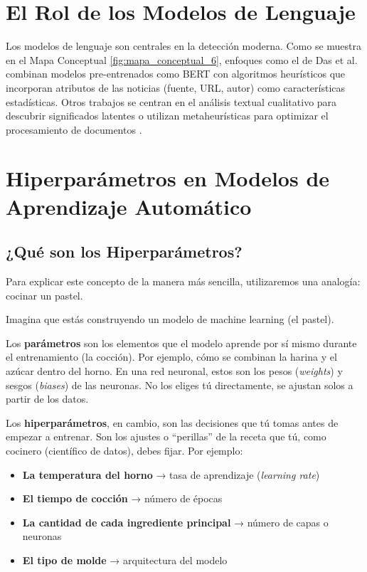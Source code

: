 \section{El Rol de los Modelos de Lenguaje}
Los modelos de lenguaje son centrales en la detección moderna. Como se muestra en el Mapa Conceptual \ref{fig:mapa_conceptual_6}, enfoques como el de Das et al. \cite{das2022heuristic} combinan modelos pre-entrenados como BERT con algoritmos heurísticos que incorporan atributos de las noticias (fuente, URL, autor) como características estadísticas. Otros trabajos se centran en el análisis textual cualitativo para descubrir significados latentes \cite{ali2020posttruth} o utilizan metaheurísticas para optimizar el procesamiento de documentos \cite{aqil2021modeling}.

\section{Hiperparámetros en Modelos de Aprendizaje Automático}
\label{sec:hiperparametros}

\subsection{¿Qué son los Hiperparámetros?}

Para explicar este concepto de la manera más sencilla, utilizaremos una analogía: cocinar un pastel.

Imagina que estás construyendo un modelo de machine learning (el pastel).

Los \textbf{parámetros} son los elementos que el modelo aprende por sí mismo durante el entrenamiento (la cocción). Por ejemplo, cómo se combinan la harina y el azúcar dentro del horno. En una red neuronal, estos son los pesos (\textit{weights}) y sesgos (\textit{biases}) de las neuronas. No los eliges tú directamente, se ajustan solos a partir de los datos.

Los \textbf{hiperparámetros}, en cambio, son las decisiones que tú tomas antes de empezar a entrenar. Son los ajustes o ``perillas'' de la receta que tú, como cocinero (científico de datos), debes fijar. Por ejemplo:

\begin{itemize}
    \item \textbf{La temperatura del horno} → tasa de aprendizaje (\textit{learning rate})
    \item \textbf{El tiempo de cocción} → número de épocas
    \item \textbf{La cantidad de cada ingrediente principal} → número de capas o neuronas
    \item \textbf{El tipo de molde} → arquitectura del modelo
\end{itemize}

